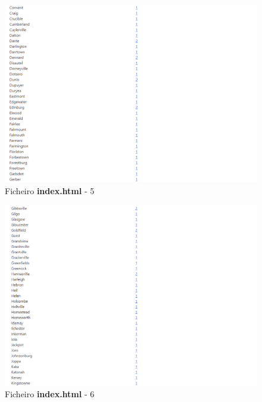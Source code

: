 \documentclass[runningheads]{llncs}
\begin{document}
\begin{figure}
    \centering
    \includegraphics[width=\linewidth]{assets/index5.png}
    \caption{Ficheiro \textbf{index.html} - 5}
    \label{fig:index.html5}
\end{figure}

\begin{figure}
    \centering
    \includegraphics[width=\linewidth]{assets/index6.png}
    \caption{Ficheiro \textbf{index.html} - 6}
    \label{fig:index.html6}
\end{figure}
\end{document}

